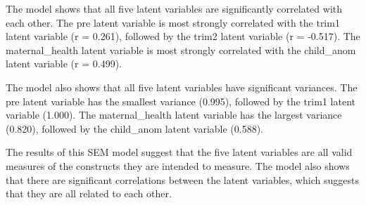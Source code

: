 \documentclass[
  letterpaper,
  DIV=11,
  numbers=noendperiod]{scrartcl}
\begin{document}
The model shows that all five latent variables are significantly
correlated with each other. The pre latent variable is most strongly
correlated with the trim1 latent variable (r = 0.261), followed by the
trim2 latent variable (r = -0.517). The maternal\_health latent variable
is most strongly correlated with the child\_anom latent variable (r =
0.499).

The model also shows that all five latent variables have significant
variances. The pre latent variable has the smallest variance (0.995),
followed by the trim1 latent variable (1.000). The maternal\_health
latent variable has the largest variance (0.820), followed by the
child\_anom latent variable (0.588).

The results of this SEM model suggest that the five latent variables are
all valid measures of the constructs they are intended to measure. The
model also shows that there are significant correlations between the
latent variables, which suggests that they are all related to each
other.
\end{document}
